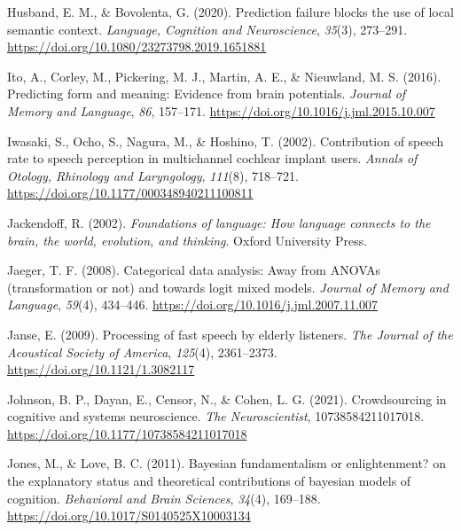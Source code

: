 \documentclass[a4paper, nobind]{templates/ociamthesis}
\newlength{\cslhangindent}
\newenvironment{CSLReferences}[2] %
 {%
  \setlength{\parindent}{0pt}
  \ifodd #1
  \let\oldpar\par
  \def\par{\hangindent=\cslhangindent\oldpar}
  \fi
  \setlength{\parskip}{1mm}
  \setlength{\baselineskip}{6mm}
 }%
 {}
\begin{document}
\begin{CSLReferences}{1}{0}
\leavevmode{}%
Husband, E. M., \& Bovolenta, G. (2020). {Prediction failure blocks the use of local semantic context}. \emph{Language, Cognition and Neuroscience}, \emph{35}(3), 273--291. \url{https://doi.org/10.1080/23273798.2019.1651881}

\leavevmode{}%
Ito, A., Corley, M., Pickering, M. J., Martin, A. E., \& Nieuwland, M. S. (2016). {Predicting form and meaning: Evidence from brain potentials}. \emph{Journal of Memory and Language}, \emph{86}, 157--171. \url{https://doi.org/10.1016/j.jml.2015.10.007}

\leavevmode{}%
Iwasaki, S., Ocho, S., Nagura, M., \& Hoshino, T. (2002). {Contribution of speech rate to speech perception in multichannel cochlear implant users}. \emph{Annals of Otology, Rhinology and Laryngology}, \emph{111}(8), 718--721. \url{https://doi.org/10.1177/000348940211100811}

\leavevmode{}%
Jackendoff, R. (2002). \emph{Foundations of language: How language connects to the brain, the world, evolution, and thinking}. Oxford University Press.

\leavevmode{}%
Jaeger, T. F. (2008). {Categorical data analysis: Away from ANOVAs (transformation or not) and towards logit mixed models}. \emph{Journal of Memory and Language}, \emph{59}(4), 434--446. \url{https://doi.org/10.1016/j.jml.2007.11.007}

\leavevmode{}%
Janse, E. (2009). {Processing of fast speech by elderly listeners}. \emph{The Journal of the Acoustical Society of America}, \emph{125}(4), 2361--2373. \url{https://doi.org/10.1121/1.3082117}

\leavevmode{}%
Johnson, B. P., Dayan, E., Censor, N., \& Cohen, L. G. (2021). {Crowdsourcing in cognitive and systems neuroscience}. \emph{The Neuroscientist}, 10738584211017018. \url{https://doi.org/10.1177/10738584211017018}

\leavevmode{}%
Jones, M., \& Love, B. C. (2011). {Bayesian fundamentalism or enlightenment? on the explanatory status and theoretical contributions of bayesian models of cognition}. \emph{Behavioral and Brain Sciences}, \emph{34}(4), 169--188. \url{https://doi.org/10.1017/S0140525X10003134}


\end{CSLReferences}
\end{document}
